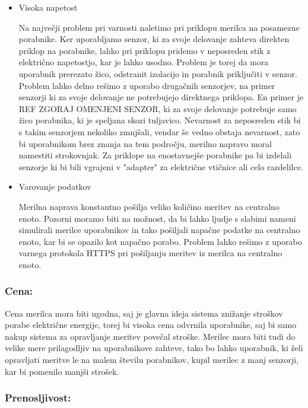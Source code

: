 \documentclass[12pt,a4paper,titlepage,openany]{report}
\begin{document}
\begin{itemize}
\item Visoka napetost

Na največji problem pri varnosti naletimo pri priklopu merilca na posamezne porabnike. Ker uporabljamo senzor, ki za svoje delovanje zahteva direkten priklop na porabnike, lahko pri priklopu pridemo v neposreden stik z električno napetostjo, kar je lahko usodno. Problem je torej da mora uporabnik prerezato žico, odstranit izolacijo in porabnik priključiti v senzor. Problem lahko delno rešimo z uporabo drugačnih senzorjev, na primer senzorji ki za svoje delovanje ne potrebujejo direktnega priklopa. En primer je REF ZGORAJ OMENJENI SENZOR, ki za svoje delovanje potrebuje samo žico porabnika, ki je speljana skozi tuljavico. Nevarnost za neposreden stik bi s takim senzorjem nekoliko zmnjšali, vendar še vedno obstaja nevarnost, zato bi uporabnikom brez znanja na tem področju, merilno napravo moral namestiti strokovnjak. Za priklope na enostavnejše porabnike pa bi izdelali senzorje ki bi bili vgrajeni v "adapter" za električne vtičnice ali celo razdelilce.

\item Varovanje podatkov

Merilna naprava konstantno pošilja veliko količino meritev na centralno enoto. Pozorni moramo biti na možnost, da bi lahko ljudje s slabimi nameni simulirali merilce uporabnikov in tako pošiljali napačne podatke na centralno enoto, kar bi se opazilo kot napačno porabo. Problem lahko rešimo z uporabo varnega protokola HTTPS pri pošiljanju meritev iz merilca na centralno enoto.

\end{itemize}


\subsubsection{Cena:}

Cena merilca mora biti ugodna, saj je glavna ideja sistema znižanje stroškov porabe električne energije, torej bi visoka cena odvrnila uporabnike, saj bi samo nakup sistema za opravljanje meritev povečal stroške. Merilec mora biti tudi do velike mere prilagodljiv na uporabnikove zahteve, tako bo lahko uporabnik, ki želi opravljati meritve le na malem številu porabnikov, kupil merilec z manj senzorji, kar bi pomenilo manjši strošek.

\subsubsection{Prenosljivost:}
\end{document}
